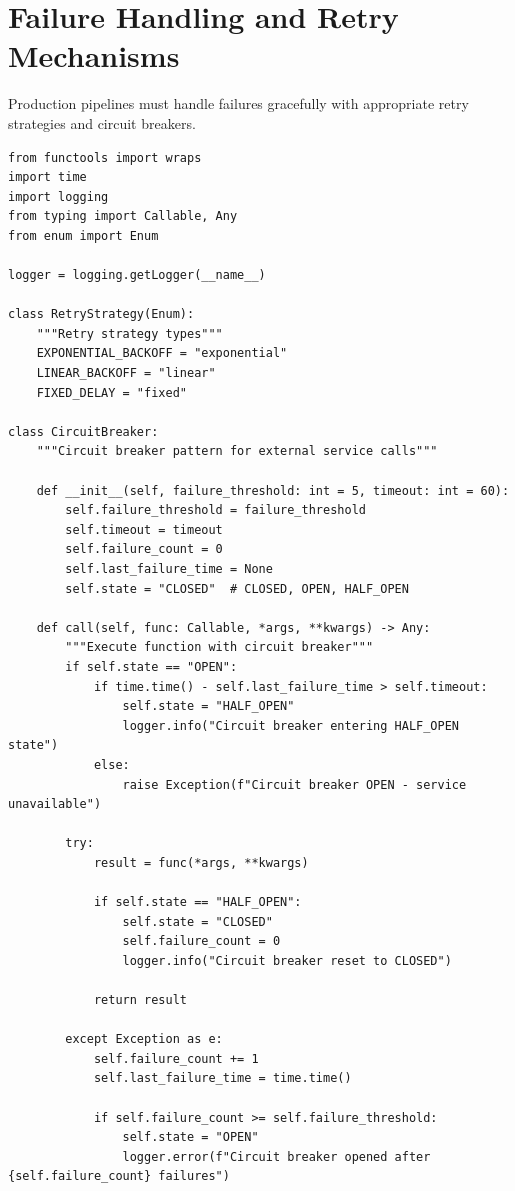 \section{Failure Handling and Retry Mechanisms}

Production pipelines must handle failures gracefully with appropriate retry strategies and circuit breakers.

\begin{lstlisting}[style=python, caption=Robust failure handling for ML pipelines]
from functools import wraps
import time
import logging
from typing import Callable, Any
from enum import Enum

logger = logging.getLogger(__name__)

class RetryStrategy(Enum):
    """Retry strategy types"""
    EXPONENTIAL_BACKOFF = "exponential"
    LINEAR_BACKOFF = "linear"
    FIXED_DELAY = "fixed"

class CircuitBreaker:
    """Circuit breaker pattern for external service calls"""

    def __init__(self, failure_threshold: int = 5, timeout: int = 60):
        self.failure_threshold = failure_threshold
        self.timeout = timeout
        self.failure_count = 0
        self.last_failure_time = None
        self.state = "CLOSED"  # CLOSED, OPEN, HALF_OPEN

    def call(self, func: Callable, *args, **kwargs) -> Any:
        """Execute function with circuit breaker"""
        if self.state == "OPEN":
            if time.time() - self.last_failure_time > self.timeout:
                self.state = "HALF_OPEN"
                logger.info("Circuit breaker entering HALF_OPEN state")
            else:
                raise Exception(f"Circuit breaker OPEN - service unavailable")

        try:
            result = func(*args, **kwargs)

            if self.state == "HALF_OPEN":
                self.state = "CLOSED"
                self.failure_count = 0
                logger.info("Circuit breaker reset to CLOSED")

            return result

        except Exception as e:
            self.failure_count += 1
            self.last_failure_time = time.time()

            if self.failure_count >= self.failure_threshold:
                self.state = "OPEN"
                logger.error(f"Circuit breaker opened after {self.failure_count} failures")


\end{lstlisting}

